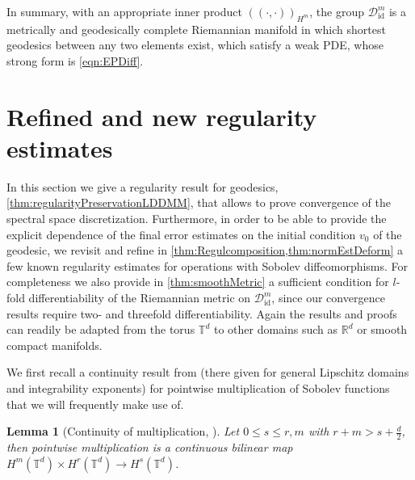 \documentclass[a4paper, 12pt]{article}
\newtheorem{lemma}[theorem]{Lemma}
\newcommand{\R}{\mathbb{R}}
\newcommand{\T}{\mathbb{T}}
\newcommand{\id}{\mathrm{id}}
\newcommand{\DiffSobId}{\mathcal D_{\id}}
\newcommand{\IPHm}[2]{(\!(#1,#2)\!)_{H^m}} %
\begin{document}
In summary, with an appropriate inner product $\IPHm{\cdot}{\cdot}$, the group $\DiffSobId^m$ is a metrically and geodesically complete Riemannian manifold
in which shortest geodesics between any two elements exist, which satisfy a weak PDE, whose strong form is \eqref{eqn:EPDiff}.

\section{Refined and new regularity estimates}\label{sec:estimates}
In this section we give a regularity result for geodesics, \cref{thm:regularityPreservationLDDMM}, that allows to prove convergence of the spectral space discretization.
Furthermore, in order to be able to provide the explicit dependence of the final error estimates on the initial condition $v_0$ of the geodesic,
we revisit and refine in \cref{thm:Regulcomposition,thm:normEstDeform} a few known regularity estimates for operations with Sobolev diffeomorphisms.
For completeness we also provide in \cref{thm:smoothMetric} a sufficient condition for $l$-fold differentiability of the Riemannian metric on $\DiffSobId^m$,
since our convergence results require two- and threefold differentiability.
Again the results and proofs can readily be adapted from the torus $\T^d$ to other domains such as $\R^d$ or smooth compact manifolds.

We first recall a continuity result from \cite{BeHo21} (there given for general Lipschitz domains and integrability exponents) for pointwise multiplication of Sobolev functions that we will frequently make use of.
\begin{lemma}[{Continuity of multiplication, \cite[Cor.\,6.3, Thm.\,7.4]{BeHo21}}]\label{thm:BeHo21}
Let $0\leq s\leq r,m$ with $r+m>s+\frac d2$, then pointwise multiplication is a continuous bilinear map $H^m(\T^d)\times H^r(\T^d)\to H^s(\T^d)$.
\end{lemma}
\end{document}
